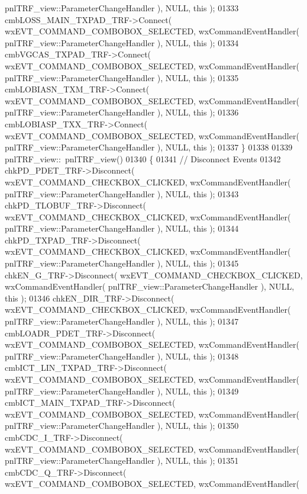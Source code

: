 \begin{DoxyCode}
      pnlTRF_view::ParameterChangeHandler ), NULL, \textcolor{keyword}{this} );
01333     cmbLOSS_MAIN_TXPAD_TRF->Connect( wxEVT\_COMMAND\_COMBOBOX\_SELECTED, wxCommandEventHandler( 
      pnlTRF_view::ParameterChangeHandler ), NULL, \textcolor{keyword}{this} );
01334     cmbVGCAS_TXPAD_TRF->Connect( wxEVT\_COMMAND\_COMBOBOX\_SELECTED, wxCommandEventHandler( 
      pnlTRF_view::ParameterChangeHandler ), NULL, \textcolor{keyword}{this} );
01335     cmbLOBIASN_TXM_TRF->Connect( wxEVT\_COMMAND\_COMBOBOX\_SELECTED, wxCommandEventHandler( 
      pnlTRF_view::ParameterChangeHandler ), NULL, \textcolor{keyword}{this} );
01336     cmbLOBIASP_TXX_TRF->Connect( wxEVT\_COMMAND\_COMBOBOX\_SELECTED, wxCommandEventHandler( 
      pnlTRF_view::ParameterChangeHandler ), NULL, \textcolor{keyword}{this} );
01337 \}
01338 
01339 pnlTRF_view::~pnlTRF_view()
01340 \{
01341     \textcolor{comment}{// Disconnect Events}
01342     chkPD_PDET_TRF->Disconnect( wxEVT\_COMMAND\_CHECKBOX\_CLICKED, wxCommandEventHandler( 
      pnlTRF_view::ParameterChangeHandler ), NULL, \textcolor{keyword}{this} );
01343     chkPD_TLOBUF_TRF->Disconnect( wxEVT\_COMMAND\_CHECKBOX\_CLICKED, wxCommandEventHandler( 
      pnlTRF_view::ParameterChangeHandler ), NULL, \textcolor{keyword}{this} );
01344     chkPD_TXPAD_TRF->Disconnect( wxEVT\_COMMAND\_CHECKBOX\_CLICKED, wxCommandEventHandler( 
      pnlTRF_view::ParameterChangeHandler ), NULL, \textcolor{keyword}{this} );
01345     chkEN_G_TRF->Disconnect( wxEVT\_COMMAND\_CHECKBOX\_CLICKED, wxCommandEventHandler( 
      pnlTRF_view::ParameterChangeHandler ), NULL, \textcolor{keyword}{this} );
01346     chkEN_DIR_TRF->Disconnect( wxEVT\_COMMAND\_CHECKBOX\_CLICKED, wxCommandEventHandler( 
      pnlTRF_view::ParameterChangeHandler ), NULL, \textcolor{keyword}{this} );
01347     cmbLOADR_PDET_TRF->Disconnect( wxEVT\_COMMAND\_COMBOBOX\_SELECTED, wxCommandEventHandler( 
      pnlTRF_view::ParameterChangeHandler ), NULL, \textcolor{keyword}{this} );
01348     cmbICT_LIN_TXPAD_TRF->Disconnect( wxEVT\_COMMAND\_COMBOBOX\_SELECTED, wxCommandEventHandler( 
      pnlTRF_view::ParameterChangeHandler ), NULL, \textcolor{keyword}{this} );
01349     cmbICT_MAIN_TXPAD_TRF->Disconnect( wxEVT\_COMMAND\_COMBOBOX\_SELECTED, wxCommandEventHandler( 
      pnlTRF_view::ParameterChangeHandler ), NULL, \textcolor{keyword}{this} );
01350     cmbCDC_I_TRF->Disconnect( wxEVT\_COMMAND\_COMBOBOX\_SELECTED, wxCommandEventHandler( 
      pnlTRF_view::ParameterChangeHandler ), NULL, \textcolor{keyword}{this} );
01351     cmbCDC_Q_TRF->Disconnect( wxEVT\_COMMAND\_COMBOBOX\_SELECTED, wxCommandEventHandler( 

\end{DoxyCode}
